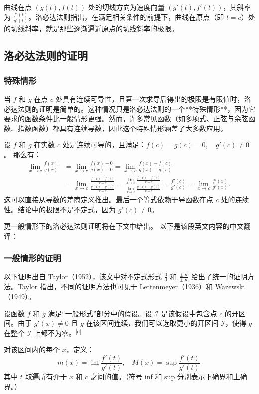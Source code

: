 曲线在点 $(g(t), f(t))$ 处的切线方向为速度向量 $(g'(t), f'(t))$，其斜率为 $\frac{f'(t)}{g'(t)}$。洛必达法则指出，在满足相关条件的前提下，曲线在原点（即 $t = c$）处的切线斜率，就是那些逐渐逼近原点的切线斜率的极限。
\subsection{洛必达法则的证明}
\subsubsection{特殊情形}
当 $f$ 和 $g$ 在点 $c$ 处具有连续可导性，且第一次求导后得出的极限是有限值时，洛必达法则的证明是简单的。这种情况只是洛必达法则的一个**特殊情形**，因为它要求的函数条件比一般情形更强。然而，许多常见函数（如多项式、正弦与余弦函数、指数函数）都具有连续导数，因此这个特殊情形涵盖了大多数应用。

设 $f$ 和 $g$ 在实数 $c$ 处是连续可导的，且满足：$f(c) = g(c) = 0,\quad g'(c) \neq 0$。
那么有：
$$
\begin{aligned}
\lim_{x \to c} \frac{f(x)}{g(x)}
&= \lim_{x \to c} \frac{f(x) - 0}{g(x) - 0}= \lim_{x \to c} \frac{f(x) - f(c)}{g(x) - g(c)} \\
&= \lim_{x \to c} \frac{\frac{f(x) - f(c)}{x - c}}{\frac{g(x) - g(c)}{x - c}} = \frac{\lim\limits_{x \to c} \frac{f(x) - f(c)}{x - c}}{\lim\limits_{x \to c} \frac{g(x) - g(c)}{x - c}}= \frac{f'(c)}{g'(c)} = \lim_{x \to c} \frac{f'(x)}{g'(x)}.
\end{aligned}~
$$
这可以直接从导数的差商定义推出。最后一个等式依赖于导函数在点 $c$ 处的连续性。结论中的极限不是不定式，因为 $g'(c) \neq 0$。

更一般情形下的洛必达法则证明将在下文中给出。
以下是该段英文内容的中文翻译：
\subsubsection{一般情形的证明}
以下证明出自 Taylor（1952），该文中对不定式形式 $\frac{0}{0}$ 和 $\frac{\pm\infty}{\pm\infty}$ 给出了统一的证明方法。Taylor 指出，不同的证明方法也可见于 Lettenmeyer（1936）和 Wazewski（1949）。

设函数 $f$ 和 $g$ 满足“一般形式”部分中的假设。设 $\mathcal{I}$ 是该假设中包含点 $c$ 的开区间。由于 $g'(x) \ne 0$ 且 $g$ 在该区间连续，我们可以选取更小的开区间 $\mathcal{I}$，使得 $g$ 在整个 $\mathcal{I}$ 上都不为零。\(^\text{[d]}\)

对该区间内的每个 $x$，定义：
$$
m(x) = \inf \frac{f'(t)}{g'(t)},\quad M(x) = \sup \frac{f'(t)}{g'(t)}~
$$
其中 $t$ 取遍所有介于 $x$ 和 $c$ 之间的值。（符号 inf 和 sup 分别表示下确界和上确界。）

